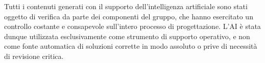 \documentclass[a4paper,12pt]{article}
\begin{document}
Tutti i contenuti generati con il supporto dell’intelligenza artificiale sono stati oggetto di verifica da parte dei componenti del gruppo, che hanno esercitato un controllo costante e consapevole sull’intero processo di progettazione. L’AI è stata dunque utilizzata esclusivamente come strumento di supporto operativo, e non come fonte automatica di soluzioni corrette in modo assoluto o prive di necessità di revisione critica.
\end{document}
